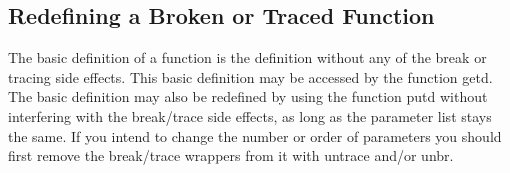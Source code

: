 \subsection{Redefining a Broken or Traced Function}

  The  basic  definition of a function is the definition without
any of the break or tracing side effects.  This basic definition
may be accessed by the function getd.  The basic definition  may
also be redefined by using the function putd without interfering
with the break/trace side effects, as long as the parameter list
stays  the same.  If you intend to change the number or order of
parameters you should first remove the break/trace wrappers from
it with untrace and/or unbr.



